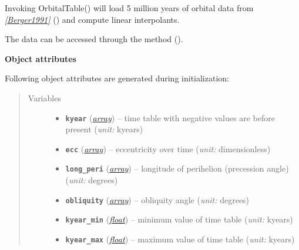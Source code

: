 \documentclass[a4paper,10pt,english]{sphinxmanual}
\begin{document}

\begin{fulllineitems}
\label{api/climlab.solar:climlab.solar.orbital.OrbitalTable}
Invoking OrbitalTable() will load 5 million years of orbital data
from \label{api/climlab.solar:id7}{\hyperref[references:berger1991]{\emph{{[}Berger1991{]}}}} () and compute linear interpolants.

The data can be accessed through the method {\hyperref[api/climlab.solar:climlab.solar.orbital.OrbitalTable.lookup_parameters]{\emph{}}} ().

\textbf{Object attributes}

Following object attributes are generated during initialization:
\begin{quote}\begin{description}
\item[{Variables}] \leavevmode\begin{itemize}
\item {} 
\textbf{\texttt{kyear}} (\href{http://docs.python.org/2.7/library/array.html\#module-array}{\emph{array}}) -- time table with negative values are before present 
(\emph{unit:} kyears)

\item {} 
\textbf{\texttt{ecc}} (\href{http://docs.python.org/2.7/library/array.html\#module-array}{\emph{array}}) -- eccentricity over time (\emph{unit:} dimensionless)

\item {} 
\textbf{\texttt{long\_peri}} (\href{http://docs.python.org/2.7/library/array.html\#module-array}{\emph{array}}) -- longitude of perihelion (precession angle) (\emph{unit:} degrees)

\item {} 
\textbf{\texttt{obliquity}} (\href{http://docs.python.org/2.7/library/array.html\#module-array}{\emph{array}}) -- obliquity angle (\emph{unit:} degrees)

\item {} 
\textbf{\texttt{kyear\_min}} (\href{http://docs.python.org/2.7/library/functions.html\#float}{\emph{float}}) -- minimum value of time table (\emph{unit:} kyears)

\item {} 
\textbf{\texttt{kyear\_max}} (\href{http://docs.python.org/2.7/library/functions.html\#float}{\emph{float}}) -- maximum value of time table (\emph{unit:} kyears)


\end{itemize}
\end{description}
\end{quote}
\end{fulllineitems}
\end{document}
